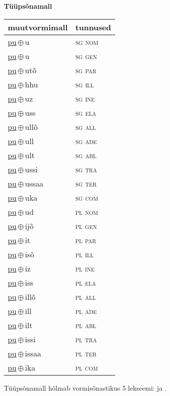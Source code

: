 

\vspace{3.5em}
\noindent \begin{minipage}{\textwidth}
\noindent \textbf{Tüüpsõnamall \,}\\

\begin{sideways}
\begin{tabular}{l l}
muutvormimall & tunnused \\
\hline
\underline{pu}\,$\oplus$\,u & \textsc{ sg nom } \\
\underline{pu}\,$\oplus$\,u & \textsc{ sg gen } \\
\underline{pu}\,$\oplus$\,utõ & \textsc{ sg par } \\
\underline{pu}\,$\oplus$\,hhu & \textsc{ sg ill } \\
\underline{pu}\,$\oplus$\,uz & \textsc{ sg ine } \\
\underline{pu}\,$\oplus$\,uss & \textsc{ sg ela } \\
\underline{pu}\,$\oplus$\,ullõ & \textsc{ sg all } \\
\underline{pu}\,$\oplus$\,ull & \textsc{ sg ade } \\
\underline{pu}\,$\oplus$\,ult & \textsc{ sg abl } \\
\underline{pu}\,$\oplus$\,ussi & \textsc{ sg tra } \\
\underline{pu}\,$\oplus$\,ussaa & \textsc{ sg ter } \\
\underline{pu}\,$\oplus$\,uka & \textsc{ sg com } \\
\underline{pu}\,$\oplus$\,ud & \textsc{ pl nom } \\
\underline{pu}\,$\oplus$\,ijõ & \textsc{ pl gen } \\
\underline{pu}\,$\oplus$\,it & \textsc{ pl par } \\
\underline{pu}\,$\oplus$\,isõ & \textsc{ pl ill } \\
\underline{pu}\,$\oplus$\,iz & \textsc{ pl ine } \\
\underline{pu}\,$\oplus$\,iss & \textsc{ pl ela } \\
\underline{pu}\,$\oplus$\,illõ & \textsc{ pl all } \\
\underline{pu}\,$\oplus$\,ill & \textsc{ pl ade } \\
\underline{pu}\,$\oplus$\,ilt & \textsc{ pl abl } \\
\underline{pu}\,$\oplus$\,issi & \textsc{ pl tra } \\
\underline{pu}\,$\oplus$\,issaa & \textsc{ pl ter } \\
\underline{pu}\,$\oplus$\,ika & \textsc{ pl com } \\
\end{tabular}
\end{sideways}
\label{tab:tüüpsõnamall-puu}

\end{minipage}

 
\vspace{1em}
\noindent Tüüpsõnamall  hõlmab vormisõnastikus 5 lekseemi:  ja .
